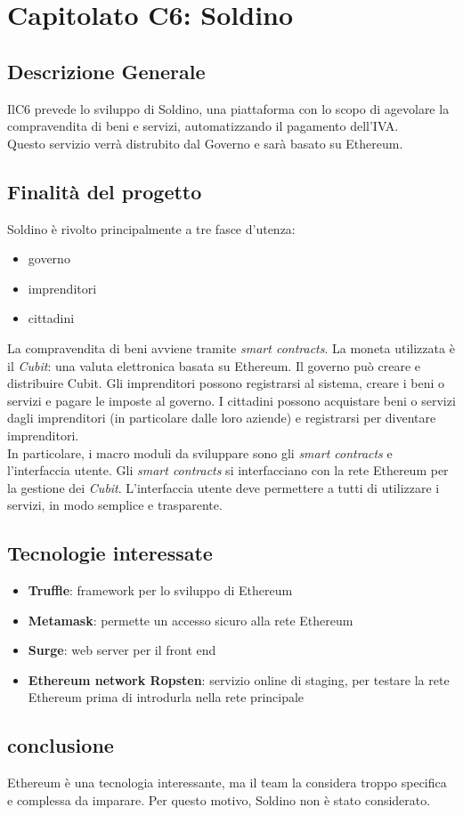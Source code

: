 \chapter{Capitolato C6: Soldino}
\section{Descrizione Generale}

IlC6 prevede lo sviluppo di Soldino, una piattaforma con lo scopo di agevolare la compravendita di beni e servizi, automatizzando il pagamento dell'IVA.\\
Questo servizio verrà distrubito dal Governo e sarà basato su Ethereum. 


\section{Finalit\`a del progetto}
Soldino è rivolto principalmente a tre fasce d'utenza:
\begin{itemize}
	\item governo
	\item imprenditori
	\item cittadini
\end{itemize}
La compravendita di beni avviene tramite \textit{smart contracts}. La moneta utilizzata è il \textit{Cubit}: una valuta elettronica basata su Ethereum.
Il governo può creare e distribuire Cubit. Gli imprenditori possono registrarsi al sistema, creare i beni o servizi e pagare le imposte al governo. I cittadini possono acquistare beni o servizi dagli imprenditori (in particolare dalle loro aziende) e registrarsi per diventare imprenditori.\\
In particolare, i macro moduli da sviluppare sono gli \textit{smart contracts} e l'interfaccia utente. Gli \textit{smart contracts} si interfacciano con la rete Ethereum per la gestione dei \textit{Cubit}. L'interfaccia utente deve permettere a tutti di utilizzare i servizi, in modo semplice e trasparente.


\section{Tecnologie interessate}
\begin{itemize}
	\item \textbf{Truffle}: framework per lo sviluppo di Ethereum
	\item \textbf{Metamask}: permette un accesso sicuro alla rete Ethereum
	\item \textbf{Surge}: web server per il front end
	\item \textbf{Ethereum network Ropsten}: servizio online di staging, per testare la rete Ethereum prima di introdurla nella rete principale
	
\end{itemize}
\section{conclusione}
Ethereum è una tecnologia interessante, ma il team la considera troppo specifica e complessa da imparare. Per questo motivo, Soldino non è stato considerato. 